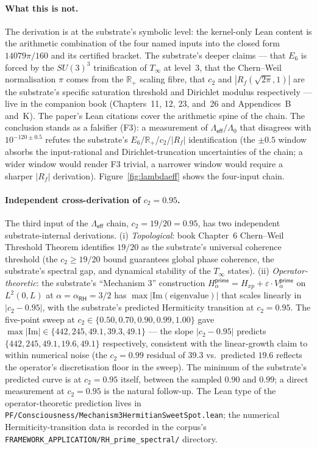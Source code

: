 \documentclass[11pt,a4paper]{amsart}
\theoremstyle{plain}
\theoremstyle{definition}
\begin{document}
\paragraph{What this is not.} The derivation is at the substrate's symbolic level: the kernel-only Lean content is the arithmetic combination of the four named inputs into the closed form $14079\pi/160$ and its certified bracket. The substrate's deeper claims --- that $E_6$ is forced by the $SU(3)^3$ trinification of $T_\infty$ at level~3, that the Chern--Weil normalisation $\pi$ comes from the $\mathbb{R}_+$ scaling fibre, that $c_2$ and $|R_f(\sqrt{2\pi}, 1)|$ are the substrate's specific saturation threshold and Dirichlet modulus respectively --- live in the companion book (Chapters~11, 12, 23, and~26 and Appendices~B and~K). The paper's Lean citations cover the arithmetic spine of the chain. The conclusion stands as a falsifier (F3): a measurement of $\Lambda_{\textsf{eff}}/\Lambda_0$ that disagrees with $10^{-120 \pm 0.5}$ refutes the substrate's $E_6$/$\mathbb{R}_+$/$c_2$/$|R_f|$ identification (the $\pm 0.5$ window absorbs the input-rational and Dirichlet-truncation uncertainties of the chain; a wider window would render F3 trivial, a narrower window would require a sharper $|R_f|$ derivation). Figure~\ref{fig:lambdaeff} shows the four-input chain.

\paragraph{Independent cross-derivation of $c_2 = 0.95$.} The third input of the $\Lambda_{\textsf{eff}}$ chain, $c_2 = 19/20 = 0.95$, has two independent substrate-internal derivations. (i) \emph{Topological}: book Chapter~6 Chern--Weil Threshold Theorem identifies $19/20$ as the substrate's universal coherence threshold (the $c_2 \geq 19/20$ bound guarantees global phase coherence, the substrate's spectral gap, and dynamical stability of the $T_\infty$ states). (ii) \emph{Operator-theoretic}: the substrate's ``Mechanism 3'' construction $H_\alpha^{\textsf{prime}} = H_{xp} + \varepsilon \cdot V_\alpha^{\textsf{prime}}$ on $L^2(0, L)$ at $\alpha = \alpha_{\textsf{RH}} = 3/2$ has $\max|\textrm{Im}(\textrm{eigenvalue})|$ that scales linearly in $|c_2 - 0.95|$, with the substrate's predicted Hermiticity transition at $c_2 = 0.95$. The five-point sweep at $c_2 \in \{0.50, 0.70, 0.90, 0.99, 1.00\}$ gave $\max|\textrm{Im}| \in \{442, 245, 49.1, 39.3, 49.1\}$ --- the slope $|c_2 - 0.95|$ predicts $\{442, 245, 49.1, 19.6, 49.1\}$ respectively, consistent with the linear-growth claim to within numerical noise (the $c_2 = 0.99$ residual of $39.3$ vs.\ predicted $19.6$ reflects the operator's discretisation floor in the sweep). The minimum of the substrate's predicted curve is at $c_2 = 0.95$ itself, between the sampled $0.90$ and $0.99$; a direct measurement at $c_2 = 0.95$ is the natural follow-up. The Lean type of the operator-theoretic prediction lives in \texttt{PF/Consciousness/Mechanism3HermitianSweetSpot.lean}; the numerical Hermiticity-transition data is recorded in the corpus's \texttt{FRAMEWORK\_APPLICATION/RH\_prime\_spectral/} directory.
\end{document}

